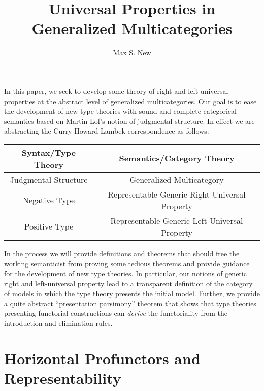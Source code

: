 \documentclass{article}
\begin{document}
\newtheorem{theorem}{Theorem}
\newtheorem{definition}{Definition}
\newcommand{\pto}{\nrightarrow}
\newcommand{\pfrom}{\nleftarrow}
\newcommand{\vcat}{\mathcal}
\newcommand{\cat}{\mathbb}
\newcommand{\vtkmnd}{\mathbb{K}\text{Mod}(\vcat{V},T)}
\newcommand{\rmod}{\text{RMod}}
\newcommand{\lmod}{\text{LMod}}

\title{Universal Properties in Generalized Multicategories}
\author{Max S. New}

\maketitle

In this paper, we seek to develop some theory of right and left
universal properties at the abstract level of generalized
multicategories.
%
Our goal is to ease the development of new type theories with sound
and complete categorical semantics based on Martin-Lof's notion of
judgmental structure.
%
In effect we are abstracting the Curry-Howard-Lambek correspondence as
follows:

\begin{tabular}{|c|c|}
  \hline
  Syntax/Type Theory & Semantics/Category Theory\\ \hline \hline
  Judgmental Structure & Generalized Multicategory\\ \hline
  Negative Type & Representable Generic Right Universal Property\\ \hline
  Positive Type & Representable Generic Left Universal Property\\ \hline  
\end{tabular}

In the process we will provide definitions and theorems that should
free the working semanticist from proving some tedious theorems and
provide guidance for the development of new type theories.
%
In particular, our notions of generic right and left-universal
property lead to a transparent definition of the category of models in
which the type theory presents the initial model.
Further, we provide a quite abstract ``presentation parsimony''
theorem that shows that type theories presenting functorial
constructions can \emph{derive} the functoriality from the
introduction and elimination rules.

\section{Horizontal Profunctors and Representability}
\end{document}
